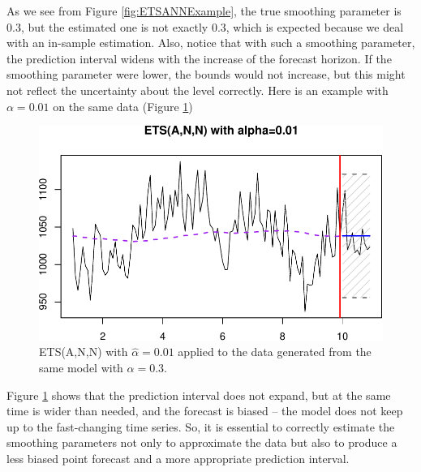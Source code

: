 \documentclass[
]{book}
\newenvironment{Shaded}{\begin{snugshade}}{\end{snugshade}}
\newcommand{\AttributeTok}[1]{\textcolor[rgb]{0.77,0.63,0.00}{#1}}
\newcommand{\ConstantTok}[1]{\textcolor[rgb]{0.00,0.00,0.00}{#1}}
\newcommand{\DecValTok}[1]{\textcolor[rgb]{0.00,0.00,0.81}{#1}}
\newcommand{\FloatTok}[1]{\textcolor[rgb]{0.00,0.00,0.81}{#1}}
\newcommand{\FunctionTok}[1]{\textcolor[rgb]{0.00,0.00,0.00}{#1}}
\newcommand{\NormalTok}[1]{#1}
\newcommand{\OtherTok}[1]{\textcolor[rgb]{0.56,0.35,0.01}{#1}}
\newcommand{\SpecialCharTok}[1]{\textcolor[rgb]{0.00,0.00,0.00}{#1}}
\newcommand{\StringTok}[1]{\textcolor[rgb]{0.31,0.60,0.02}{#1}}
\theoremstyle{definition}
\theoremstyle{definition}
\theoremstyle{definition}
\theoremstyle{definition}
\theoremstyle{remark}
\begin{document}
As we see from Figure \ref{fig:ETSANNExample}, the true smoothing parameter is 0.3, but the estimated one is not exactly 0.3, which is expected because we deal with an in-sample estimation. Also, notice that with such a smoothing parameter, the prediction interval widens with the increase of the forecast horizon. If the smoothing parameter were lower, the bounds would not increase, but this might not reflect the uncertainty about the level correctly. Here is an example with \(\alpha=0.01\) on the same data (Figure \ref{fig:ETSANNExamplealpha01})

\begin{Shaded}
\end{Shaded}

\begin{figure}
\centering
\includegraphics{Svetunkov--2022----ADAM_files/figure-latex/ETSANNExamplealpha01-1.pdf}
\caption{\label{fig:ETSANNExamplealpha01}ETS(A,N,N) with \(\hat{\alpha}=0.01\) applied to the data generated from the same model with \(\alpha=0.3\).}
\end{figure}

Figure \ref{fig:ETSANNExamplealpha01} shows that the prediction interval does not expand, but at the same time is wider than needed, and the forecast is biased -- the model does not keep up to the fast-changing time series. So, it is essential to correctly estimate the smoothing parameters not only to approximate the data but also to produce a less biased point forecast and a more appropriate prediction interval.
\end{document}
